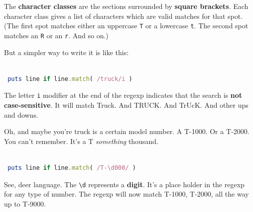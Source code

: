 \documentclass[10pt,twoside]{report}
\begin{document}
The {\bf character classes} are the sections surrounded by {\bf square
  brackets}.  Each character class gives a list of characters which
are valid matches for that spot.  (The first spot matches either an
uppercase \lstinline[breaklines=true]|T| or a lowercase
\lstinline[breaklines=true]|t|.  The second spot matches an
\lstinline[breaklines=true]|R| or an \lstinline[breaklines=true]|r|.
And so on.)

But a simpler way to write it is like this:


\begin{lstlisting}[basicstyle=\ttfamily\color{basiccolor},
    commentstyle = \ttfamily\color{commentcolor},
    keywordstyle=\ttfamily\color{keywordscolor},
    stringstyle=\color{stringcolor},
    language=Ruby,
    basicstyle=\small\ttfamily,
    showstringspaces=false,
  ]

 puts line if line.match( /truck/i )

\end{lstlisting}


The letter \lstinline[breaklines=true]|i| modifier at the end of the
regexp indicates that the search is {\bf not case-sensitive}.  It will
match Truck.  And TRUCK.  And TrUcK.  And other ups and downs.

Oh, and maybe you're truck is a certain model number.  A T-1000.  Or a
T-2000.  You can't remember.  It's a T {\em something} thousand.


\begin{lstlisting}[basicstyle=\ttfamily\color{basiccolor},
    commentstyle = \ttfamily\color{commentcolor},
    keywordstyle=\ttfamily\color{keywordscolor},
    stringstyle=\color{stringcolor},
    language=Ruby,
    basicstyle=\small\ttfamily,
    showstringspaces=false,
  ]

 puts line if line.match( /T-\d000/ )

\end{lstlisting}


See, deer language.  The \lstinline[breaklines=true]|\d| represents a
{\bf digit}.  It's a place holder in the regexp for any type of
number.  The regexp will now match T-1000, T-2000, all the way up to
T-9000.

\newpage
\end{document}
